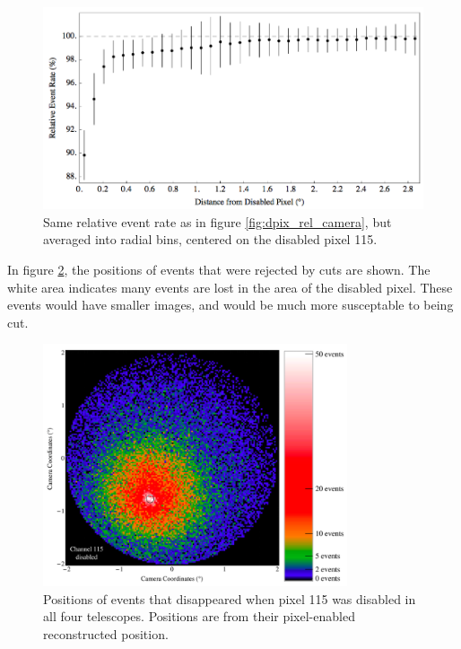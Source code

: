     \begin{figure}[ht]
      \begin{center}
        \includegraphics[width=\textwidth]{images/disabled_pixel/relativerate_radial}
        \caption[Radial Relative Event Rate]{Same relative event rate as in figure \ref{fig:dpix_rel_camera}, but averaged into radial bins, centered on the disabled pixel 115. }\label{fig:dpix_rel_radial}
      \end{center}
    \end{figure}

    In figure \ref{fig:dpix_disappear}, the positions of events that were rejected by cuts are shown.
    The white area indicates many events are lost in the area of the disabled pixel.
    These events would have smaller images, and would be much more susceptable to being cut.

    \begin{figure}[ht]
      \begin{center}
        \includegraphics[width=0.8\textwidth]{images/disabled_pixel/disappearing_events}
        \caption[Disappearing Events]{Positions of events that disappeared when pixel 115 was disabled in all four telescopes.  Positions are from their pixel-enabled reconstructed position.}\label{fig:dpix_disappear}
      \end{center}
    \end{figure}

